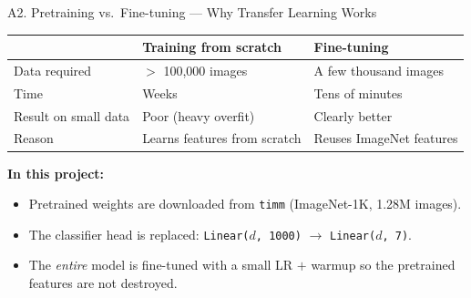 \documentclass[10pt, aspectratio=169]{beamer}
\begin{document}
\begin{frame}{A2. Pretraining vs.\ Fine-tuning --- Why Transfer Learning Works}
    \footnotesize
    \begin{table}[]
        \centering
        \begin{tabular}{lll}
        \toprule
        \rowcolor{usthblue!25} & \textbf{Training from scratch} & \textbf{Fine-tuning} \\
        \midrule
        Data required   & $>$ 100,000 images              & A few thousand images \\
        Time            & Weeks                            & Tens of minutes       \\
        Result on small data & Poor (heavy overfit)        & Clearly better         \\
        Reason          & Learns features from scratch    & Reuses ImageNet features \\
        \bottomrule
        \end{tabular}
    \end{table}

    \vspace{0.3cm}
    \textbf{In this project:}
    \begin{itemize}
        \item Pretrained weights are downloaded from \texttt{timm} (ImageNet-1K, 1.28M images).
        \item The classifier head is replaced: \texttt{Linear($d$, 1000)} $\rightarrow$ \texttt{Linear($d$, 7)}.
        \item The \textit{entire} model is fine-tuned with a small LR $+$ warmup so the pretrained features are not destroyed.
    \end{itemize}
\end{frame}
\end{document}
